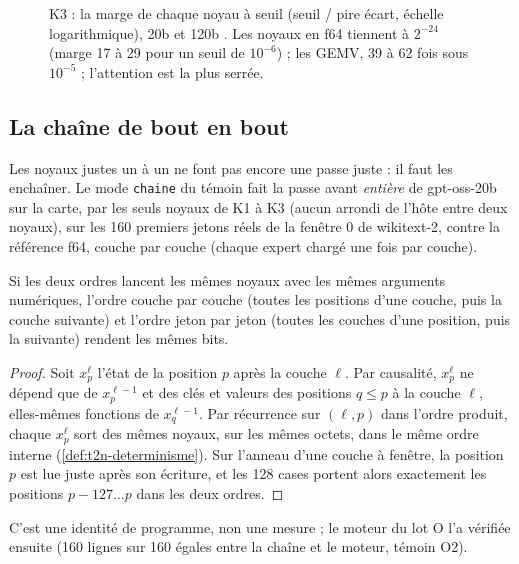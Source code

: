 \begin{figure}[!htbp]
\centering
\GrapheNoyMarges
\caption[K3 : la marge de chaque noyau à son seuil]{K3 : la marge de chaque noyau à seuil (seuil / pire écart, échelle logarithmique), 20b et 120b \mes. Les noyaux en f64 tiennent à $2^{-24}$ (marge 17 à 29 pour un seuil de $10^{-6}$) ; les GEMV, 39 à 62 fois sous $10^{-5}$ ; l'attention est la plus serrée.}
\label{fig:t2n-marges}
\end{figure}

\subsection{La chaîne de bout en bout}

Les noyaux justes un à un ne font pas encore une passe juste : il faut les enchaîner. Le mode \texttt{chaine} du témoin fait la passe avant \emph{entière} de gpt-oss-20b sur la carte, par les seuls noyaux de K1 à K3 (aucun arrondi de l'hôte entre deux noyaux), sur les 160 premiers jetons réels de la fenêtre 0 de wikitext-2, contre la référence f64, couche par couche (chaque expert chargé une fois par couche).

\begin{proposition}[Ordre couche par couche = ordre jeton par jeton]\label{prop:t2n-ordre}
Si les deux ordres lancent les mêmes noyaux avec les mêmes arguments numériques, l'ordre couche par couche (toutes les positions d'une couche, puis la couche suivante) et l'ordre jeton par jeton (toutes les couches d'une position, puis la suivante) rendent les mêmes bits.
\end{proposition}

\begin{proof}
Soit $x_p^\ell$ l'état de la position $p$ après la couche $\ell$. Par causalité, $x_p^\ell$ ne dépend que de $x_p^{\ell-1}$ et des clés et valeurs des positions $q \le p$ à la couche $\ell$, elles-mêmes fonctions de $x_q^{\ell-1}$. Par récurrence sur $(\ell, p)$ dans l'ordre produit, chaque $x_p^\ell$ sort des mêmes noyaux, sur les mêmes octets, dans le même ordre interne (\cref{def:t2n-determinisme}). Sur l'anneau d'une couche à fenêtre, la position $p$ est lue juste après son écriture, et les 128 cases portent alors exactement les positions $p - 127 \ldots p$ dans les deux ordres.
\end{proof}

C'est une identité de programme, non une mesure ; le moteur du lot O l'a vérifiée ensuite (160 lignes sur 160 égales entre la chaîne et le moteur, témoin O2).

